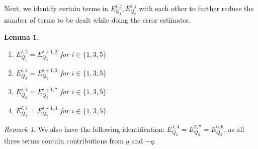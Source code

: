 \documentclass[sn-mathphys, Numbered ,a4paper]{sn-jnl}%
\theoremstyle{plain}
\newtheorem{lemma}[theorem]{Lemma}
\theoremstyle{definition}
\theoremstyle{remark}
\newtheorem{remark}[theorem]{Remark}
\theoremstyle{plain}
\theoremstyle{definition}
\theoremstyle{remark}
\begin{document}
Next, we identify certain terms in $E_{Q_1}^{i,j}, E_{Q_2}^{i,j}$ with each other to further reduce the number of terms to be dealt while doing the error estimates.

\begin{lemma}
	\begin{enumerate}
		\item $E_{Q_1}^{i,2} = E_{Q_1}^{i+1,2}$ for $i \in \{1, 3, 5\}$\\
		\item $E_{Q_2}^{i,3} = E_{Q_2}^{i+1,3}$ for $i \in \{1, 3, 5\}$\\
		\item $E_{Q_2}^{i,4} = E_{Q_2}^{i+1,7}$ for $i \in \{1, 3, 5\}$\\
		\item $E_{Q_2}^{i,7} = E_{Q_2}^{i+1,4}$ for $i \in \{1, 3, 5\}$ 
	\end{enumerate}
\end{lemma}	 
\begin{remark}
	We also have the following identification: $E_{Q_2}^{1,4} = E_{Q_2}^{2,7} = E_{Q_2}^{6,6}$,  as all three terms contain contributions from $q$ and $-q$. 
\end{remark}
\end{document}
